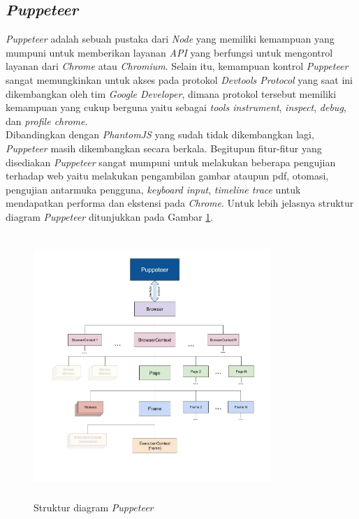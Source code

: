 		\subsection{\textit{Puppeteer}}
			\textit{Puppeteer} adalah sebuah pustaka dari \textit{Node} yang memiliki kemampuan yang mumpuni untuk memberikan layanan \textit{API} yang berfungsi untuk mengontrol layanan dari \textit{Chrome} atau \textit{Chromium}. Selain itu, kemampuan kontrol \textit{Puppeteer} sangat memungkinkan untuk akses pada protokol \textit{Devtools Protocol} yang saat ini dikembangkan oleh tim \textit{Google Developer}, dimana protokol tersebut memiliki kemampuan yang cukup berguna yaitu sebagai \textit{tools instrument}, \textit{inspect}, \textit{debug}, dan \textit{profile chrome}.\cite{puppeteer} \\
			\indent Dibandingkan dengan \textit{PhantomJS} yang sudah tidak dikembangkan lagi, \textit{Puppeteer} masih dikembangkan secara berkala. Begitupun fitur-fitur yang disediakan \textit{Puppeteer} sangat mumpuni untuk melakukan beberapa pengujian terhadap web yaitu melakukan pengambilan gambar ataupun pdf, otomasi, pengujian antarmuka pengguna, \textit{keyboard input}, \textit{timeline trace} untuk mendapatkan performa dan ekstensi pada \textit{Chrome}. Untuk lebih jelasnya struktur diagram \textit{Puppeteer} ditunjukkan pada Gambar \ref{puppeteeroverview}.
			\begin{figure}[H]
				\centering
				\includegraphics[width=9cm,height=10cm]{Images/C-2/puppeteeroverview.jpg}
				\caption{Struktur diagram \textit{Puppeteer}}
				\label{puppeteeroverview}
			\end{figure}
			
